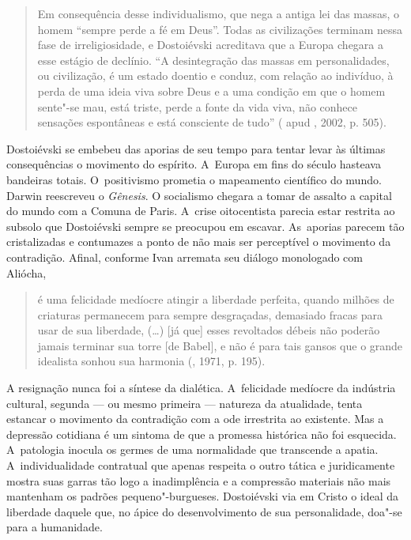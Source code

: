 \begin{quote}
Em consequência desse individualismo, que nega a antiga lei das massas,
o homem ``sempre perde a fé em Deus''. Todas as civilizações terminam
nessa fase de irreligiosidade, e Dostoiévski acreditava que a Europa
chegara a esse estágio de declínio. ``A desintegração das massas em
personalidades, ou civilização, é um estado doentio e conduz, com
relação ao indivíduo, à perda de uma ideia viva sobre Deus e a uma
condição em que o homem sente"-se mau, está triste, perde a fonte da vida
viva, não conhece sensações espontâneas e está consciente de tudo''
( apud , 2002, p. 505).
\end{quote}

Dostoiévski se embebeu das aporias de seu tempo para tentar levar às
últimas consequências o movimento do espírito. A~Europa em fins do
século  hasteava bandeiras totais. O~positivismo prometia o
mapeamento científico do mundo. Darwin reescreveu o \emph{Gênesis}. O
socialismo chegara a tomar de assalto a capital do mundo com a Comuna de
Paris. A~crise oitocentista parecia estar restrita ao subsolo que
Dostoiévski sempre se preocupou em escavar. As~aporias parecem tão
cristalizadas e contumazes a ponto de não mais ser perceptível o
movimento da contradição. Afinal, conforme Ivan arremata seu diálogo
monologado com Aliócha,

\begin{quote}
é uma felicidade medíocre atingir a liberdade perfeita, quando milhões
de criaturas permanecem para sempre desgraçadas, demasiado fracas para
usar de sua liberdade, (\ldots) {[}já que{]} esses revoltados débeis não
poderão jamais terminar sua torre {[}de Babel{]}, e não é para tais
gansos que o grande idealista sonhou sua harmonia (, 1971, p.
195).
\end{quote}

A resignação nunca foi a síntese da dialética. A~felicidade medíocre da
indústria cultural, segunda --- ou mesmo primeira --- natureza da
atualidade, tenta estancar o movimento da contradição com a ode
irrestrita ao existente. Mas a depressão cotidiana é um sintoma de que a
promessa histórica não foi esquecida. A~patologia inocula os germes de
uma normalidade que transcende a apatia. A~individualidade contratual
que apenas respeita o outro tática e juridicamente mostra suas garras
tão logo a inadimplência e a compressão materiais não mais mantenham os
padrões pequeno"-burgueses. Dostoiévski via em Cristo o ideal da
liberdade daquele que, no ápice do desenvolvimento de sua personalidade,
doa"-se para a humanidade.

